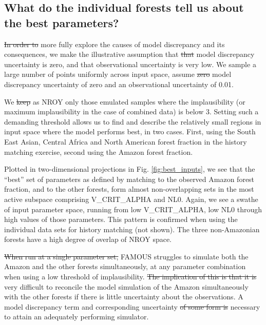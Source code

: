 \documentclass[esd, article]{copernicus} %
\providecommand{\DIFadd}[1]{{\protect\color{blue}\uwave{#1}}} %
\providecommand{\DIFdel}[1]{{\protect\color{red}\sout{#1}}}                      %
\providecommand{\DIFaddbegin}{} %
\providecommand{\DIFaddend}{} %
\providecommand{\DIFdelbegin}{} %
\providecommand{\DIFdelend}{} %
\begin{document}
\subsection{What do the individual forests tell us about the best parameters?}\label{ssec:learn}
\DIFdelbegin \DIFdel{In order to }\DIFdelend \DIFaddbegin \DIFadd{To }\DIFaddend more fully explore the causes of model discrepancy and its consequences, we make the illustrative assumption that \DIFdelbegin \DIFdel{that }\DIFdelend model discrepancy uncertainty is zero, and that observational uncertainty is very low. We sample a large number of points uniformly across input space, assume \DIFdelbegin \DIFdel{zero }\DIFdelend model discrepancy uncertainty of zero and an observational uncertainty of 0.01.

We \DIFdelbegin \DIFdel{keep }\DIFdelend \DIFaddbegin \DIFadd{classify }\DIFaddend as NROY only those emulated samples where the implausibility (or maximum implausibility in the case of combined data) is below 3. Setting such a demanding threshold allows us to find and describe the relatively small regions in input space where the model performs best, in two cases. First, using the South East Asian, Central Africa and North American forest fraction in the history matching exercise, second using the Amazon forest fraction.


Plotted in two-dimensional projections in Fig.  \ref{fig:best_inputs}, we see that the ``best'' set of parameters as defined by matching to the observed Amazon forest fraction, and to the other forests, form almost non-overlapping sets in the most active subspace comprising V\_CRIT\_ALPHA and NL0. Again, we see a swathe of input parameter space, running from low V\_CRIT\_ALPHA, low NL0 through high values of those parameters. This pattern is confirmed when using the individual data sets for history matching (not shown). The three non-Amazonian forests have a high degree of overlap of NROY space.

\DIFdelbegin \DIFdel{When run at a single parameter set, }\DIFdelend FAMOUS struggles to simulate both the Amazon and the other forests simultaneously, at any parameter combination when using a low threshold of implausibility.  \DIFdelbegin \DIFdel{The implication of this is that it is }\DIFdelend \DIFaddbegin \DIFadd{It is }\DIFaddend very difficult to reconcile the model simulation of the Amazon simultaneously with the other forests if there is little uncertainty about the observations. A model discrepancy term and corresponding uncertainty \DIFdelbegin \DIFdel{of some form is }\DIFdelend \DIFaddbegin \DIFadd{is therefore }\DIFaddend necessary to attain an adequately performing simulator.
\end{document}

